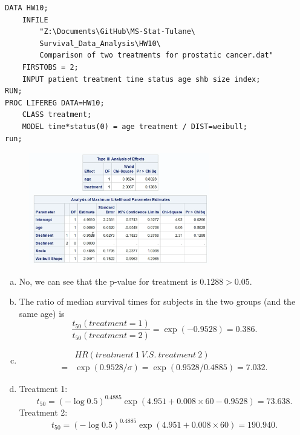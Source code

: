 \documentclass{elegantbook}
\begin{document}
\begin{solution}
    \begin{verbatim}
DATA HW10; 
    INFILE 
        "Z:\Documents\GitHub\MS-Stat-Tulane\
        Survival_Data_Analysis\HW10\
        Comparison of two treatments for prostatic cancer.dat"
    FIRSTOBS = 2;
    INPUT patient treatment time status age shb size index;
RUN;
PROC LIFEREG DATA=HW10;
    CLASS treatment;
    MODEL time*status(0) = age treatment / DIST=weibull;
run;
    \end{verbatim}
    \begin{figure}[H]
        \centering
        \includegraphics[width=0.7\textwidth]{HW10_1.png}
    \end{figure}
\begin{enumerate}[(a)]
    \item No, we can see that the p-value for treatment is $0.1288>0.05$. 
    \item The ratio of median survival times for subjects in the two groups (and the same age) is 
    \[\frac{t_{50}(treatment=1)}{t_{50}(treatment=2)}=\exp(-0.9528)=0.386. \]
    \item \begin{align*}
        &HR(treatment\ 1\ V.S.\ treatment\ 2)\\
        =&\exp(0.9528/\sigma)=\exp(0.9528/0.4885)=7.032. 
    \end{align*}
    \item Treatment 1:
    \[ t_{50} = (-\log0.5)^{0.4885} \exp( 4.951 + 0.008 \times 60 - 0.9528 )= 73.638. \]
    Treatment 2: 
    \[t_{50} = (-\log0.5)^{0.4885} \exp(4.951 + 0.008 \times 60) = 190.940. \]
\end{enumerate}
\end{solution}
\end{document}
